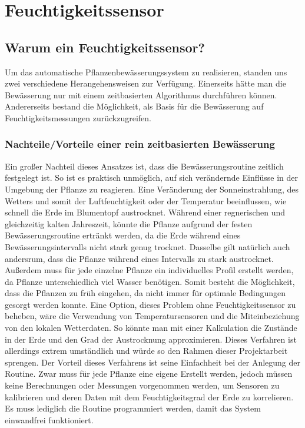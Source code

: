 \newpage
\fancyhf{}
\section{Feuchtigkeitssensor}
\subsection{Warum ein Feuchtigkeitssensor?}
Um das automatische Pflanzenbewässerungssystem zu realisieren, standen uns zwei
verschiedene Herangehensweisen zur Verfügung. Einerseits hätte man die Bewässerung nur
mit einem zeitbasierten Algorithmus durchführen können. Andererseits bestand die
Möglichkeit, als Basis für die Bewässerung auf Feuchtigkeitsmessungen zurückzugreifen.

\subsubsection{Nachteile/Vorteile einer rein zeitbasierten Bewässerung}
Ein großer Nachteil dieses Ansatzes ist, dass die Bewässerungsroutine zeitlich festgelegt ist.
So ist es praktisch unmöglich, auf sich verändernde Einflüsse in der Umgebung der Pflanze zu
reagieren. Eine Veränderung der Sonneinstrahlung, des Wetters und somit der
Luftfeuchtigkeit oder der Temperatur beeinflussen, wie schnell die Erde im Blumentopf
austrocknet. Während einer regnerischen und gleichzeitig kalten Jahreszeit, könnte die
Pflanze aufgrund der festen Bewässerungsroutine ertränkt werden, da die Erde während
eines Bewässerungsintervalls nicht stark genug trocknet. Dasselbe gilt natürlich auch
andersrum, dass die Pflanze während eines Intervalls zu stark austrocknet. Außerdem muss
für jede einzelne Pflanze ein individuelles Profil erstellt werden, da Pflanze unterschiedlich
viel Wasser benötigen. Somit besteht die Möglichkeit, dass die Pflanzen zu früh eingehen, da
nicht immer für optimale Bedingungen gesorgt werden konnte. Eine Option, dieses Problem
ohne Feuchtigkeitssensor zu beheben, wäre die Verwendung von Temperatursensoren und
die Miteinbeziehung von den lokalen Wetterdaten. So könnte man mit einer Kalkulation die
Zustände in der Erde und den Grad der Austrocknung approximieren. Dieses Verfahren ist
allerdings extrem umständlich und würde so den Rahmen dieser Projektarbeit sprengen.
Der Vorteil dieses Verfahrens ist seine Einfachheit bei der Anlegung der Routine. Zwar muss
für jede Pflanze eine eigene Erstellt werden, jedoch müssen keine Berechnungen oder
Messungen vorgenommen werden, um Sensoren zu kalibrieren und deren Daten mit dem
Feuchtigkeitsgrad der Erde zu korrelieren. Es muss lediglich die Routine programmiert
werden, damit das System einwandfrei funktioniert.

